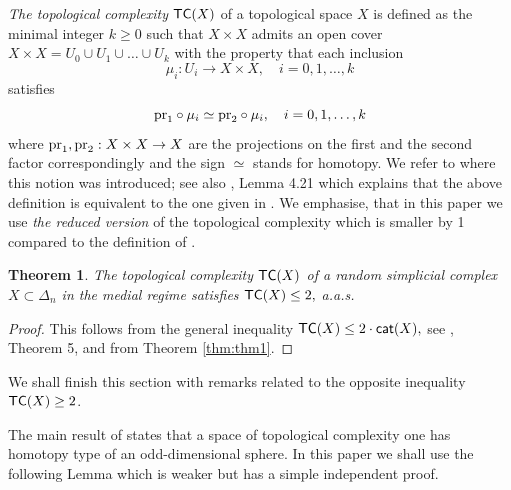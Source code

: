\documentclass[11pt,twoside, reqno]{amsart}
\theoremstyle{plain}
\newtheorem{teo}[lema]{Theorem}
\theoremstyle{definition}
\newcommand{\cat}{{\sf{cat}}}
\newcommand{\tc}{{\sf{TC}}}
\newcommand{\pr}{{\rm {pr}}}
\begin{document}
{\it The topological complexity} $\tc(X)$ of a topological space $X$ is defined as the minimal integer $k\ge 0$ such that $X\times X$ admits an open cover 
$X\times X=U_0\cup U_1\cup \dots \cup U_k$ with the property that each inclusion $$\mu_i: U_i\to X\times X, \quad i=0, 1, \dots, k$$ satisfies 
$${\pr}_1\circ \mu_{i}\simeq {\pr}_2\circ \mu_i, \quad i=0, 1, \dots, k$$ where
${\pr}_1, {\pr}_2: X\times X\to X$ are the projections on the first and the second factor correspondingly and the sign $\simeq$ stands for homotopy. 
We refer to \cite{Far0} where this notion was introduced;
see also \cite{Far2},  Lemma 4.21 which explains that the above definition is equivalent to the one given in \cite{Far0}. 
We emphasise, that in this paper we use {\it the reduced version} of the topological complexity which is smaller by 1 compared to the definition of \cite{Far0}. 

\begin{teo}\label{thm:tcle2}
The topological complexity  $\tc(X)$ of a random simplicial complex $X\subset \Delta_n$ in the medial regime satisfies
$
\tc(X)\le 2,
$
a.a.s.
\end{teo}
\begin{proof}
This follows from the general inequality 
$
\tc(X)\le 2\cdot \cat(X),
$
see \cite{Far0}, Theorem 5, and from Theorem \ref{thm:thm1}. 
\end{proof}

We shall finish this section with remarks related to the opposite inequality $\tc(X)\ge 2$. 


The main result of \cite{GLO} states that a space of topological complexity one has homotopy type of an odd-dimensional sphere. 
In this paper we shall use the following Lemma which is weaker but has a simple independent proof.  
\end{document}
